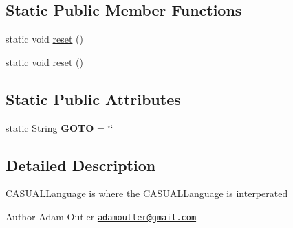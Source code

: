 \subsection*{Static Public Member Functions}
\begin{DoxyCompactItemize}
\item 
static void \hyperlink{class_c_a_s_u_a_l_1_1language_1_1_c_a_s_u_a_l_language_add131ed883c2ca04edc08b7fec449cbc}{reset} ()
\item 
static void \hyperlink{class_c_a_s_u_a_l_1_1language_1_1_c_a_s_u_a_l_language_add131ed883c2ca04edc08b7fec449cbc}{reset} ()
\end{DoxyCompactItemize}
\subsection*{Static Public Attributes}
\begin{DoxyCompactItemize}
\item 
\hypertarget{class_c_a_s_u_a_l_1_1language_1_1_c_a_s_u_a_l_language_aaf3d5e4cbbeafb67f4a472fd786ea438}{static String {\bfseries G\-O\-T\-O} = \char`\"{}\char`\"{}}\label{class_c_a_s_u_a_l_1_1language_1_1_c_a_s_u_a_l_language_aaf3d5e4cbbeafb67f4a472fd786ea438}

\end{DoxyCompactItemize}


\subsection{Detailed Description}
\hyperlink{class_c_a_s_u_a_l_1_1language_1_1_c_a_s_u_a_l_language}{C\-A\-S\-U\-A\-L\-Language} is where the \hyperlink{class_c_a_s_u_a_l_1_1language_1_1_c_a_s_u_a_l_language}{C\-A\-S\-U\-A\-L\-Language} is interperated

\begin{DoxyAuthor}{Author}
Adam Outler \href{mailto:adamoutler@gmail.com}{\tt adamoutler@gmail.\-com} 
\end{DoxyAuthor}


